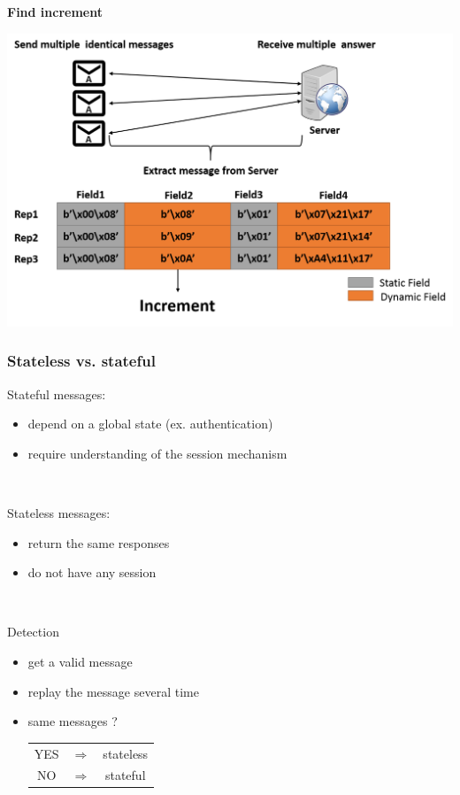 \documentclass{beamer}
\newcounter{m} %
\newcounter{c} %
\begin{document}
\begin{frame}{\bf Find increment}
\begin{center}
\includegraphics[scale=0.3]{incrementation.png}
\end{center}
\end{frame}

\begin{frame}\frametitle{\bf Stateless vs. stateful}

  Stateful messages:
  \begin{itemize}
    \item depend on a global state (ex. authentication)
    \item require understanding of the session mechanism
  \end{itemize}

  ~

  Stateless messages: 
  \begin{itemize}
    \item return the same responses
    \item do not have any session
  \end{itemize}

  ~

  \begin{block}{Detection}
    \begin{itemize}
      \item get a valid message
      \item replay the message several time
      \item same messages ? \begin{tabular}{ccc}YES &$\Rightarrow$& stateless\\NO &$\Rightarrow$& stateful\end{tabular}
    \end{itemize}
  \end{block}
\end{frame}
\end{document}
